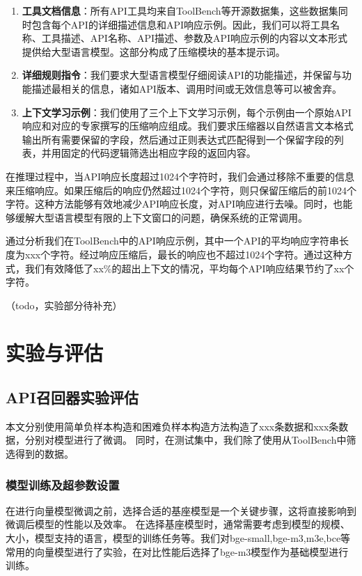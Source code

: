 \begin{enumerate}
    \item \textbf{工具文档信息}：所有API工具均来自ToolBench等开源数据集，这些数据集同时包含每个API的详细描述信息和API响应示例。因此，我们可以将工具名称、工具描述、API名称、API描述、参数及API响应示例的内容以文本形式提供给大型语言模型。这部分构成了压缩模块的基本提示词。
    
    \item \textbf{详细规则指令}：我们要求大型语言模型仔细阅读API的功能描述，并保留与功能描述最相关的信息，诸如API版本、调用时间或无效信息等可以被舍弃。
    
    \item \textbf{上下文学习示例}：我们使用了三个上下文学习示例，每个示例由一个原始API响应和对应的专家撰写的压缩响应组成。我们要求压缩器以自然语言文本格式输出所有需要保留的字段，然后通过正则表达式匹配得到一个保留字段的列表，并用固定的代码逻辑筛选出相应字段的返回内容。
\end{enumerate}

在推理过程中，当API响应长度超过1024个字符时，我们会通过移除不重要的信息来压缩响应。如果压缩后的响应仍然超过1024个字符，则只保留压缩后的前1024个字符。这种方法能够有效地减少API响应长度，对API响应进行去噪。同时，也能够缓解大型语言模型有限的上下文窗口的问题，确保系统的正常调用。

通过分析我们在ToolBench中的API响应示例，其中一个API的平均响应字符串长度为xxx个字符。经过响应压缩后，最长的响应也不超过1024个字符。通过这种方式，我们有效降低了xx\%的超出上下文的情况，平均每个API响应结果节约了xx个字符。

（todo，实验部分待补充）


\section{实验与评估}

\subsection{API召回器实验评估}

本文分别使用简单负样本构造和困难负样本构造方法构造了xxx条数据和xxx条数据，分别对模型进行了微调。
同时，在测试集中，我们除了使用从ToolBench中筛选得到的数据。

\subsubsection{模型训练及超参数设置}

在进行向量模型微调之前，选择合适的基座模型是一个关键步骤，这将直接影响到微调后模型的性能以及效率。
在选择基座模型时，通常需要考虑到模型的规模、大小，模型支持的语言，模型的训练任务等。我们对bge-small,bge-m3,m3e,bce等
常用的向量模型进行了实验，在对比性能后选择了bge-m3模型作为基础模型进行训练。


